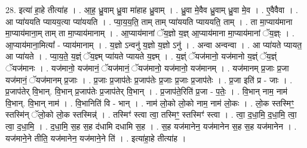 \documentclass[17pt]{extarticle}
\begin{document}
28. इत्या॑ हा॒हे तीत्या॑ह । . आ॒ह॒ ध्रु॒वाम् ध्रु॒वा मा॑हाह ध्रु॒वाम् । . ध्रु॒वा मे॒वैव ध्रु॒वाम् ध्रु॒वा मे॒व । . ए॒वैवैवा । . आ प्या॑ययति प्यायय॒त्या प्या॑ययति । . प्या॒य॒य॒ति॒ ताम् ताम् प्या॑ययति प्याययति॒ ताम् । . ता मा॒प्याय॑माना मा॒प्याय॑माना॒म् ताम् ता मा॒प्याय॑मानाम् । . आ॒प्याय॑मानां ॅय॒ज्ञो य॒ज्ञ् आ॒प्याय॑माना मा॒प्याय॑मानां ॅय॒ज्ञ्ः । . आ॒प्याय॑माना॒मित्या᳚ - प्याय॑मानाम् । . य॒ज्ञो ऽन्वनु॑ य॒ज्ञो य॒ज्ञो ऽनु॑ । . अन्वा अन्वन्वा । . आ प्या॑यते प्यायत॒ आ प्या॑यते । . प्या॒य॒ते॒ य॒ज्ञ्ं ॅय॒ज्ञ्म् प्या॑यते प्यायते य॒ज्ञ्म् । . य॒ज्ञ्ं ॅयज॑मानो॒ यज॑मानो य॒ज्ञ्ं ॅय॒ज्ञ्ं ॅयज॑मानः । . यज॑मानो॒ यज॑मानं॒ ॅयज॑मानं॒ ॅयज॑मानो॒ यज॑मानो॒ यज॑मानम् । . यज॑मानम् प्र॒जाः प्र॒जा यज॑मानं॒ ॅयज॑मानम् प्र॒जाः । . प्र॒जाः प्र॒जाप॑तेः प्र॒जाप॑तेः प्र॒जाः प्र॒जाः प्र॒जाप॑तेः । . प्र॒जा इति॑ प्र - जाः । . प्र॒जाप॑तेर् वि॒भान्. वि॒भान् प्र॒जाप॑तेः प्र॒जाप॑तेर् वि॒भान् । . प्र॒जाप॑ते॒रिति॑ प्र॒जा - प॒तेः॒ । . वि॒भान् नाम॒ नाम॑ वि॒भान्. वि॒भान् नाम॑ । . वि॒भानिति॑ वि - भान् । . नाम॑ लो॒को लो॒को नाम॒ नाम॑ लो॒कः । . लो॒क स्तस्मिꣳ॒॒ स्तस्मि॑न् ॅलो॒को लो॒क स्तस्मिन्न्॑ । . तस्मिꣳ॑ स्त्वा त्वा॒ तस्मिꣳ॒॒ स्तस्मिꣳ॑ स्त्वा । . त्वा॒ द॒धा॒मि॒ द॒धा॒मि॒ त्वा॒ त्वा॒ द॒धा॒मि॒ । . द॒धा॒मि॒ स॒ह स॒ह द॑धामि दधामि स॒ह । . स॒ह यज॑मानेन॒ यज॑मानेन स॒ह स॒ह यज॑मानेन । . यज॑माने॒ने तीति॒ यज॑मानेन॒ यज॑माने॒ने ति॑ । . इत्या॑हा॒हे तीत्या॑ह । \newline
\end{document}
